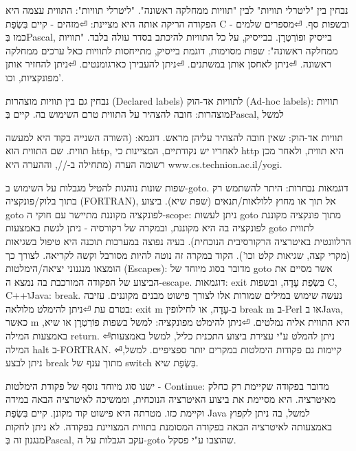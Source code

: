 \begin{טבלא}[!htbp]
        נבחין בין "ליטרלי תוויות" לבין "תוויות ממחלקה ראשונה".
        "ליטרלי תוויות": התווית עצמה היא הפקודה הריקה אותה היא מציינת:
⏎מזהים - קיים בִּשְׂפַת C ובשפות סף.
⏎מספרים שלמים - כמו בְּPascal, בייסיק ופוֹרְטְרָן. בבייסיק, על כל התוויות להיכתב בסדר עולה בלבד.
        "תוויות ממחלקה ראשונה": שפות מסוימות, דוגמת בייסיק, מתייחסות לתוויות כאל ערכים ממחלקה ראשונה.
⏎ניתן לאחסן אותן במשתנים.
⏎ניתן להעבירן כארגומנטים.
⏎ניתן להחזיר אותן מפונקציות, וכו'.

        נבחין גם בין תוויות מוצהרות (Declared labels) לתוויות אד-הוק (Ad-hoc labels):
        תוויות מוצהרות: חובה להצהיר על התווית טרם השימוש בה. קיים בְּPascal, למשל

        תוויות אד-הוק:
        שאין חובה להצהיר עליהן מראש. דוגמא:
        (השורה השנייה בקוד היא למעשה תווית. שם התווית הוא http, לאחריו יש נקודתיים, המציינות כי http היא תווית, ולאחר מכן רשומה הערה (מתחילה ב-//, וההערה היא www.cs.technion.ac.il/yogi.

        שפות שונות נוהגות להטיל מגבלות על השימוש ב-goto. דוגמאות נבחרות: היתר להשתמש רק בתוך בלוק/פונקציה (FORTRAN), אל תוך או מחוץ ללולאות/תנאים (שפת שיא).
        ביצוע goto לפונקציה מקוננת מתיישר עם חוקי ה-scope: ניתן לעשות goto מתוך פונקציה מקוננת לפונקציה בה היא מקוננת, ובמקרה של רקורסיה - ניתן לגשת באמצעות goto לתווית הרלוונטית באיטרציה הרקורסיבית הנוכחית).
        בעיה נפוצה במערכות תוכנה היא טיפול בשגיאות (מקרי קצה, שגיאות קלט וכו'). הקוד במקרה זה נוטה להיות מסורבל וקשה לקריאה. לצורך כך הומצאו מנגנוני יציאה/הימלטות (Escapes): מדובר בסוג מיוחד של goto אשר מסיים את הביצוע של הפקודה המורכבת בה נמצא ה-escape. דוגמאות: exit בִּשְׂפַת עָדָה, ובשפות C, C++וJava: break. נעשה שימוש במילים שמורות אלו לצורך פישוט מבנים מקוננים.
        עזיבה בטרם עת
⏎ניתן להימלט מלולאה: exit m ב-עָדָה, או לחילופין break m ב-Perl או בJava, כאשר m היא התווית אליה נמלטים.
⏎ניתן להימלט מפונקציה: למשל בשפות פוֹרְטְרָן או שיא, באמצעות המילה return.
⏎ניתן להמלט ע"י עצירת ביצוע התכנית כליל, למשל באמצעות המילה halt ב-FORTRAN.
⏎קיימות גם פקודות הימלטות במקרים יותר ספציפיים. למשל, ניתן לבצע break מתוך ענף של switch בִּשְׂפַת שיא.

        ישנו סוג מיוחד נוסף של פקודת הימלטות - Continue: מדובר בפקודה שקיימת רק כחלק מאיטרציה. היא מסיימת את ביצוע האיטרציה הנוכחית, וממשיכה לאיטרציה הבאה במידה וקיימת כזו. מטרתה היא פישוט קוד מקונן. קיים בִּשְׂפַת Java למשל, בה ניתן לקפוץ באמצעותה לאיטרציה הבאה בפקודה המסומנת בתווית המצויינת בפקודה. לא ניתן לחקות מנגנון זה בְּPascal, עקב הגבלות על ה-goto שהוצבו ע"י פסקל.


\end{טבלא}
